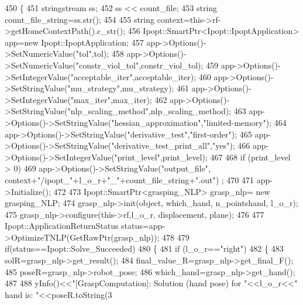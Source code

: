 \begin{DoxyCode}
450 \{
451     stringstream ss;
452     ss << count\_file;
453     \textcolor{keywordtype}{string} count\_file\_string=ss.str();
454 
455     \textcolor{keywordtype}{string} context=this->rf->getHomeContextPath().c\_str();
456     Ipopt::SmartPtr<Ipopt::IpoptApplication> app=\textcolor{keyword}{new} Ipopt::IpoptApplication;
457     app->Options()->SetNumericValue(\textcolor{stringliteral}{"tol"},tol);
458     app->Options()->SetNumericValue(\textcolor{stringliteral}{"constr\_viol\_tol"},constr\_viol\_tol);
459     app->Options()->SetIntegerValue(\textcolor{stringliteral}{"acceptable\_iter"},acceptable\_iter);
460     app->Options()->SetStringValue(\textcolor{stringliteral}{"mu\_strategy"},mu\_strategy);
461     app->Options()->SetIntegerValue(\textcolor{stringliteral}{"max\_iter"},max\_iter);
462     app->Options()->SetStringValue(\textcolor{stringliteral}{"nlp\_scaling\_method"},nlp\_scaling\_method);
463     app->Options()->SetStringValue(\textcolor{stringliteral}{"hessian\_approximation"},\textcolor{stringliteral}{"limited-memory"});
464     app->Options()->SetStringValue(\textcolor{stringliteral}{"derivative\_test"},\textcolor{stringliteral}{"first-order"});
465     app->Options()->SetStringValue(\textcolor{stringliteral}{"derivative\_test\_print\_all"},\textcolor{stringliteral}{"yes"});    
466     app->Options()->SetIntegerValue(\textcolor{stringliteral}{"print\_level"},print\_level);
467 
468     \textcolor{keywordflow}{if} (print\_level > 0)
469         app->Options()->SetStringValue(\textcolor{stringliteral}{"output\_file"}, context+\textcolor{stringliteral}{"/ipopt\_"}+l\_o\_r+\textcolor{stringliteral}{"\_"}+count\_file\_string+\textcolor{stringliteral}{".out"})
      ;
470 
471     app->Initialize();
472 
473     Ipopt::SmartPtr<grasping\_NLP>  grasp\_nlp= \textcolor{keyword}{new} grasping_NLP;
474     grasp\_nlp->init(\textcolor{keywordtype}{object}, which\_hand, n\_pointshand, l\_o\_r);
475     grasp\_nlp->configure(this->rf,l\_o\_r, displacement, plane);
476 
477     Ipopt::ApplicationReturnStatus status=app->OptimizeTNLP(GetRawPtr(grasp\_nlp));
478 
479     \textcolor{keywordflow}{if}(status==Ipopt::Solve\_Succeeded)
480     \{
481         \textcolor{keywordflow}{if} (l\_o\_r==\textcolor{stringliteral}{"right"})
482         \{
483             solR=grasp\_nlp->get\_result();
484             final\_value\_R=grasp\_nlp->get\_final\_F();
485             poseR=grasp\_nlp->robot\_pose;
486             which\_hand=grasp\_nlp->get\_hand();
487 
488             yInfo()<<\textcolor{stringliteral}{"[GraspComputation]: Solution (hand pose) for "}<<l\_o\_r<<\textcolor{stringliteral}{" hand is: "}<<poseR.toString(3

\end{DoxyCode}
